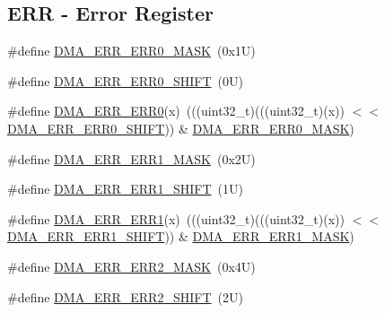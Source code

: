 \subsection*{E\+RR -\/ Error Register}
\begin{DoxyCompactItemize}
\item 
\#define \mbox{\hyperlink{group___d_m_a___register___masks_ga9101f17d9361d3e54fd4efdc051f9ec7}{D\+M\+A\+\_\+\+E\+R\+R\+\_\+\+E\+R\+R0\+\_\+\+M\+A\+SK}}~(0x1\+U)
\item 
\#define \mbox{\hyperlink{group___d_m_a___register___masks_ga0b40ac186b1c6a1be5bf5497a901448a}{D\+M\+A\+\_\+\+E\+R\+R\+\_\+\+E\+R\+R0\+\_\+\+S\+H\+I\+FT}}~(0\+U)
\item 
\#define \mbox{\hyperlink{group___d_m_a___register___masks_ga5095a007ef1bd5e5d4fcf03376e262f7}{D\+M\+A\+\_\+\+E\+R\+R\+\_\+\+E\+R\+R0}}(x)~(((uint32\+\_\+t)(((uint32\+\_\+t)(x)) $<$$<$ \mbox{\hyperlink{group___d_m_a___register___masks_ga0b40ac186b1c6a1be5bf5497a901448a}{D\+M\+A\+\_\+\+E\+R\+R\+\_\+\+E\+R\+R0\+\_\+\+S\+H\+I\+FT}})) \& \mbox{\hyperlink{group___d_m_a___register___masks_ga9101f17d9361d3e54fd4efdc051f9ec7}{D\+M\+A\+\_\+\+E\+R\+R\+\_\+\+E\+R\+R0\+\_\+\+M\+A\+SK}})
\item 
\#define \mbox{\hyperlink{group___d_m_a___register___masks_ga7499ec372d112f712c709c1a2e2abf86}{D\+M\+A\+\_\+\+E\+R\+R\+\_\+\+E\+R\+R1\+\_\+\+M\+A\+SK}}~(0x2\+U)
\item 
\#define \mbox{\hyperlink{group___d_m_a___register___masks_ga9f34d449d0ef98d8e06bcc52d8aef151}{D\+M\+A\+\_\+\+E\+R\+R\+\_\+\+E\+R\+R1\+\_\+\+S\+H\+I\+FT}}~(1\+U)
\item 
\#define \mbox{\hyperlink{group___d_m_a___register___masks_gaacda8fd2aaab8481980b1d90920a99b1}{D\+M\+A\+\_\+\+E\+R\+R\+\_\+\+E\+R\+R1}}(x)~(((uint32\+\_\+t)(((uint32\+\_\+t)(x)) $<$$<$ \mbox{\hyperlink{group___d_m_a___register___masks_ga9f34d449d0ef98d8e06bcc52d8aef151}{D\+M\+A\+\_\+\+E\+R\+R\+\_\+\+E\+R\+R1\+\_\+\+S\+H\+I\+FT}})) \& \mbox{\hyperlink{group___d_m_a___register___masks_ga7499ec372d112f712c709c1a2e2abf86}{D\+M\+A\+\_\+\+E\+R\+R\+\_\+\+E\+R\+R1\+\_\+\+M\+A\+SK}})
\item 
\#define \mbox{\hyperlink{group___d_m_a___register___masks_ga1951c1dbf65b90113283494a7f751606}{D\+M\+A\+\_\+\+E\+R\+R\+\_\+\+E\+R\+R2\+\_\+\+M\+A\+SK}}~(0x4\+U)
\item 
\#define \mbox{\hyperlink{group___d_m_a___register___masks_ga0b5f35f4d12bff35a729fae491b7c50e}{D\+M\+A\+\_\+\+E\+R\+R\+\_\+\+E\+R\+R2\+\_\+\+S\+H\+I\+FT}}~(2\+U)
\item 

\end{DoxyCompactItemize}
